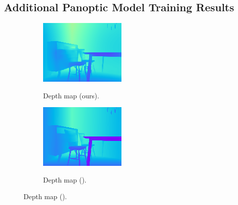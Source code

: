 \subsection{Additional Panoptic Model Training Results}

\begin{figure}
  \centering
  \begin{minipage}{0.49\linewidth}
    \centering
  \begin{subfigure}[b]{0.45\linewidth}
    \centering
    \includegraphics[width=\linewidth]{figs/depth_ours.png}
    \label{subfig:sub1}
   \vspace*{-3mm} %
  \caption{Depth map (ours).}
  \end{subfigure}
  \hfill
  \begin{subfigure}[b]{0.45\linewidth}
    \centering
    \includegraphics[width=\linewidth]{figs/depth_pan.png}
    \label{subfig:sub2}
   \vspace*{-3mm} %
  \caption{Depth map (\citep{dahnert2021panoptic}).}
  \end{subfigure}


\end{minipage}
\end{figure}
